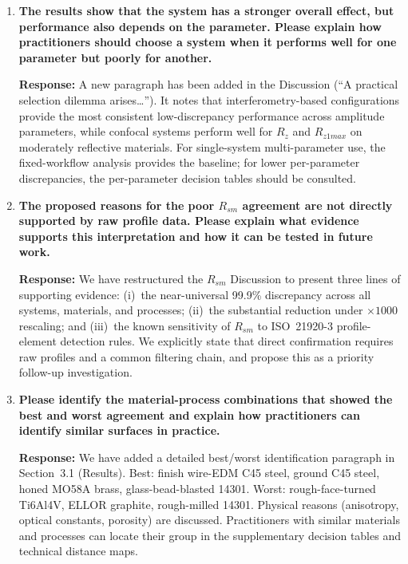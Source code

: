 \documentclass[10pt]{article}
\begin{document}
\begin{enumerate}[leftmargin=*, label=\textbf{Comment \arabic*.}, ref=\arabic*]
\textbf{Response:} We have expanded the transfer-analysis paragraph in the Discussion. Amplitude parameters show smaller transfer penalties for C45 steel across machining processes and for ground surfaces generally. $R_a$ and $R_q$ show systematically larger transfer penalties than $R_t$ and $R_z$, indicating greater sensitivity to material--process context. Cross-material transfer penalties are systematically larger than cross-process penalties within the same material.

\item \textbf{The results show that the system has a stronger overall effect, but performance also depends on the parameter. Please explain how practitioners should choose a system when it performs well for one parameter but poorly for another.}

\textbf{Response:} A new paragraph has been added in the Discussion (``A practical selection dilemma arises\ldots''). It notes that interferometry-based configurations provide the most consistent low-discrepancy performance across amplitude parameters, while confocal systems perform well for $R_z$ and $R_{z1max}$ on moderately reflective materials. For single-system multi-parameter use, the fixed-workflow analysis provides the baseline; for lower per-parameter discrepancies, the per-parameter decision tables should be consulted.

\item \textbf{The proposed reasons for the poor $R_{sm}$ agreement are not directly supported by raw profile data. Please explain what evidence supports this interpretation and how it can be tested in future work.}

\textbf{Response:} We have restructured the $R_{sm}$ Discussion to present three lines of supporting evidence: (i)~the near-universal 99.9\% discrepancy across all systems, materials, and processes; (ii)~the substantial reduction under $\times 1000$ rescaling; and (iii)~the known sensitivity of $R_{sm}$ to ISO~21920-3 profile-element detection rules. We explicitly state that direct confirmation requires raw profiles and a common filtering chain, and propose this as a priority follow-up investigation.

\item \textbf{Please identify the material-process combinations that showed the best and worst agreement and explain how practitioners can identify similar surfaces in practice.}

\textbf{Response:} We have added a detailed best/worst identification paragraph in Section~3.1 (Results). Best: finish wire-EDM C45 steel, ground C45 steel, honed MO58A brass, glass-bead-blasted 14301. Worst: rough-face-turned Ti6Al4V, ELLOR graphite, rough-milled 14301. Physical reasons (anisotropy, optical constants, porosity) are discussed. Practitioners with similar materials and processes can locate their group in the supplementary decision tables and technical distance maps.


\end{enumerate}
\end{document}
